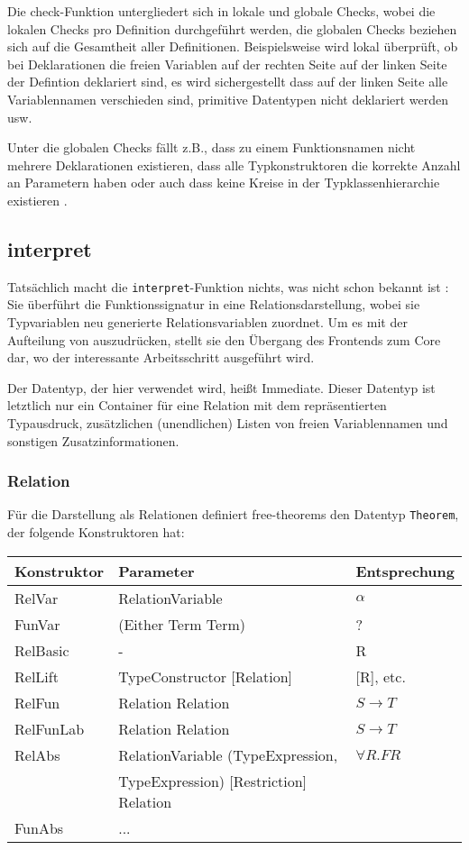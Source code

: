\documentclass[11pt]{article} %
\begin{document}
Die check-Funktion untergliedert sich in lokale und globale Checks, wobei die lokalen Checks pro Definition durchgeführt werden, die globalen Checks beziehen sich auf die Gesamtheit aller Definitionen. Beispielsweise wird lokal überprüft, ob bei Deklarationen die freien Variablen auf der rechten Seite auf der linken Seite der Defintion deklariert sind, es wird sichergestellt
dass auf der linken Seite alle Variablennamen verschieden sind, primitive Datentypen nicht deklariert werden usw.

Unter die globalen Checks fällt z.B., dass zu einem Funktionsnamen nicht mehrere Deklarationen existieren, dass alle Typkonstruktoren die korrekte Anzahl an Parametern haben oder auch dass keine Kreise in der Typklassenhierarchie existieren \cite{freetheorems}.

\subsection{interpret}

Tatsächlich macht die \texttt{interpret}-Funktion nichts, was nicht schon bekannt ist : Sie überführt die Funktionssignatur in eine
Relationsdarstellung, wobei sie Typvariablen neu generierte Relationsvariablen zuordnet. Um es mit der Aufteilung von \cite{freetheorems} auszudrücken, stellt sie den Übergang des Frontends zum Core dar, wo der interessante Arbeitsschritt ausgeführt wird.

Der Datentyp, der hier verwendet wird, heißt Immediate. Dieser Datentyp ist letztlich nur ein Container für eine Relation mit
dem repräsentierten Typausdruck, zusätzlichen (unendlichen) Listen von freien Variablennamen und sonstigen Zusatzinformationen.

\subsubsection{Relation}

Für die Darstellung als Relationen definiert free-theorems den Datentyp \texttt{Theorem}, der folgende Konstruktoren hat:


\begin{tabular}{| l | l | l |}
\hline
Konstruktor & Parameter & Entsprechung \\
\hline
RelVar & RelationVariable & $\alpha$ \\
FunVar & (Either Term Term) & ? \\
RelBasic & - & R \\
RelLift & TypeConstructor [Relation] & [R], etc. \\
RelFun & Relation Relation & $S \rightarrow T$ \\
RelFunLab & Relation Relation & $S \rightarrow T$ \\
RelAbs & RelationVariable (TypeExpression,  & $\forall R . F R$ \\
& TypeExpression) [Restriction] Relation & \\
FunAbs & ... & \\
\hline
\end{tabular}
\end{document}
